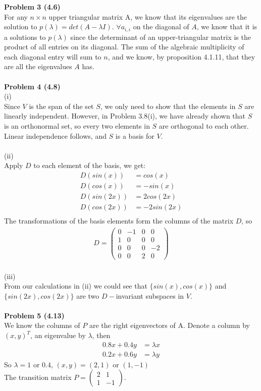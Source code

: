 \documentclass[letterpaper,12pt]{article}
\theoremstyle{definition}
\begin{document}
\noindent\textbf{Problem 3 (4.6)} \\
For any $n\times n$ upper triangular matrix A, we know that its eigenvalues are the solution to $p(\lambda) = det(A - \lambda I)$. $\forall a_{i, i}$ on the diagonal of $A$, we know that it is a solutions to $p(\lambda)$ since the determinant of an upper-triangular matrix is the product of all entries on its diagonal. The sum of the algebraic multiplicity of each diagonal entry will sum to $n$, and we know, by proposition 4.1.11, that they are all the eigenvalues $A$ has.\\
\\

\noindent\textbf{Problem 4 (4.8)} \\
(i)\\
Since $V$ is the span of the set $S$, we only need to show that the elements in $S$ are linearly independent. However, in Problem 3.8(i), we have already shown that $S$ is an orthonormal set, so every two elements in $S$ are orthogonal to each other. Linear independence follows, and $S$ is a basis for $V$.\\
\\
(ii)\\
Apply $D$ to each element of the basis, we get:
\begin{align*}
D(sin(x)) &= cos(x)\\
D(cos(x)) &= - sin(x)\\
D(sin(2x))&= 2cos(2x)\\
D(cos(2x))&= -2sin(2x)\\
\end{align*}
The transformations of the basis elements form the columns of the matrix $D$, so 
\begin{align*}
D = \begin{pmatrix}
0 & -1 & 0 & 0\\
1 & 0 & 0 & 0\\
0 & 0 & 0 & -2\\
0 & 0 & 2& 0
\end{pmatrix}
\end{align*}
\\
(iii)\\
From our calculations in (ii) we could see that $\{sin(x), cos(x)\}$ and $\{sin(2x), cos(2x)\}$ are two $D-$invariant subspaces in $V$.\\
\\
\noindent\textbf{Problem 5 (4.13)} \\
We know the columns of $P$ are the right eigenvectors of A. Denote a column by $(x, y)^T$, an eigenvalue by $\lambda$, then\\
\begin{align*}
0.8x + 0.4y &= \lambda x\\
0.2x + 0.6y &= \lambda y
\end{align*}
So $\lambda = 1$ or $0.4$, $(x, y) = (2, 1)$ or $(1, -1)$\\
The transition matrix $P = \begin{pmatrix}
2 & 1\\
1 & -1
\end{pmatrix}$.\\
\\
\end{document}

